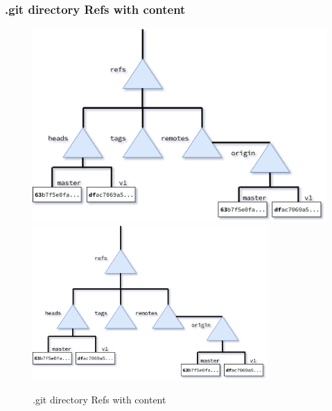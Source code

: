 \begin{frame}
    \frametitle{.git directory Refs with content}
    \addtocounter{page}{-1}
    \begin{figure}
        \begin{center}
            {
                \includegraphics[height=0.75\textheight,keepaspectratio]{./images/gitDirectory-Refs_Content.png}
            }
            {
                \includegraphics[height=0.75\textheight,width=0.8\textwidth]{./images/gitDirectory-Refs_Content.png}
            }
            \caption{.git directory Refs with content}
        \end{center}
    \end{figure}
\end{frame}

